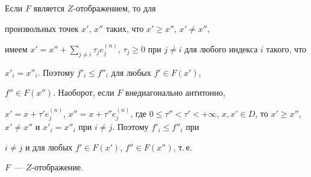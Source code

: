 \begin{pf}


Если $F$ является $Z$-отображением, то для


произвольных точек $x'$, $x''$ таких, что $x'\ge x''$, $ x'\neq x''$,


имеем $x'=x''+\sum \limits_{j \neq i}\tau_j e^{(n)}_{j}$, $\tau_j


\ge 0$ при $j \neq i$ для любого индекса $i$ такого, что


$x'_i=x''_i$. Поэтому $f'_i \le f''_i$ для любых $f' \in F(x')$,


$f'' \in F(x'')$. Наоборот, если $F$ внедиагонально антитонно,


$x'=x+\tau'e_j^{(n)}$, $x''=x+\tau''e_j^{(n)}$, где $0 \le \tau''


< \tau' < +\infty$, $x,x'\in D$, то $x'\ge x''$, $x' \neq


x''$ и $x'_i=x''_i$ при $i \neq j$. Поэтому $f'_i \le f''_i$ при


$i \neq j$ и для любых $f' \in F(x')$, $f'' \in F(x'')$, т.\,е.


$F$~--- $Z$-отображение.


\end{pf}








